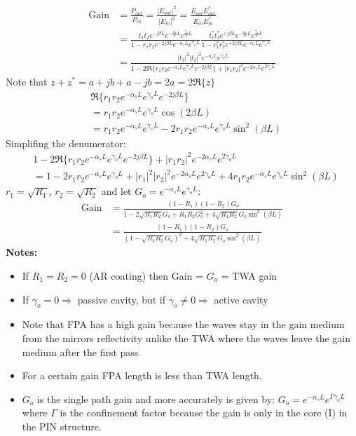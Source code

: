 \documentclass[11pt]{article}
\begin{document}
\begin{align*}
    \text{Gain} &= \frac{P_{out}}{P_{in}} = \frac{|E_{out}|^2}{|E_{in}|^2} = \frac{E_{out} E_{out}^*}{E_{in}E_{in}^*} \\
    &= \frac{t_1 t_2 e^{-j \beta L} e^{-\frac{\alpha_s}{2} L} e^{\frac{\gamma_o}{2} L}}{1 - r_1 r_2 e^{-2j \beta L} e^{-\alpha_s L} e^{\gamma_o L}} \frac{t_1^* t_2^* e^{+j \beta L} e^{-\frac{\alpha_s}{2} L} e^{\frac{\gamma_o}{2} L}}{1 - r_1^* r_2^* e^{+2j \beta L} e^{-\alpha_s L} e^{\gamma_o L}} \\
    &= \frac{|t_1|^2 |t_2|^2 e^{-\alpha_s L} e^{\gamma_o L}}{1 - 2 \Re\{r_1 r_2 e^{-\alpha_s L} e^{\gamma_o L} e^{-2j \beta L}\} + |r_1 r_2|^2 e^{-2 \alpha_s L} e^{2 \gamma_o L}}
\end{align*}
Note that $z + z^* = a + jb + a - jb = 2a = 2 \Re\{z\}$
\begin{align*}
    & \Re\{r_1 r_2 e^{-\alpha_s L} e^{\gamma_o L} e^{-2j \beta L}\} \\
    &= r_1 r_2 e^{-\alpha_s L} e^{\gamma_o L} \cos(2 \beta L) \\
    &= r_1 r_2 e^{-\alpha_s L} e^{\gamma_o L} - 2 r_1 r_2 e^{-\alpha_s L} e^{\gamma_o L} \sin^2(\beta L) 
\end{align*} 
Simplifing the denumerator:
\begin{align*}
    & 1 - 2 \Re\{r_1 r_2 e^{-\alpha_s L} e^{\gamma_o L} e^{-2j \beta L}\} + |r_1 r_2|^2 e^{-2 \alpha_s L} e^{2 \gamma_o L} \\
    &= 1 - 2 r_1 r_2 e^{-\alpha_s L} e^{\gamma_o L} + |r_1|^2 |r_2|^2 e^{-2 \alpha_s L} e^{2 \gamma_o L} + 4 r_1 r_2 e^{- \alpha_s L} e^{\gamma_o L} \sin^2(\beta L)
\end{align*}
$r_1 = \sqrt{R_1}$, $r_2 = \sqrt{R_2}$ and let $G_o = e^{-\alpha_s L} e^{\gamma_o L}$:
\begin{align*}
    \text{Gain} &= \frac{(1-R_1) (1-R_2) G_o}{1 - 2 \sqrt{R_1 R_2} G_o + R_1 R_2 G_o^2 + 4 \sqrt{R_1 R_2} G_o \sin^2(\beta L)} \\
    &= \frac{(1-R_1) (1-R_2) G_o}{(1 - \sqrt{R_1 R_2} G_o)^2 + 4 \sqrt{R_1 R_2} G_o \sin^2(\beta L)}
\end{align*}
\textbf{Notes:}
\begin{itemize}
    \item If $R_1 = R_2 = 0$ (AR coating) then Gain = $G_o$ = TWA gain
    \item If $\gamma_o = 0 \Rightarrow$ passive cavity, but if $\gamma_o \neq 0 \Rightarrow$ active cavity
    \item Note that FPA has a high gain because the waves stay in the gain medium from the mirrors reflectivity unlike the TWA where the waves leave the gain medium after the first pass.
    \item For a certain gain FPA length is less than TWA length.
    \item $G_o$ is the single path gain and more accurately is given by: $G_o = e^{-\alpha_s L} e^{\Gamma \gamma_o L}$ where $\Gamma$ is the confinement factor because the gain is only in the core (I) in the PIN structure.
\end{itemize}
\end{document}
